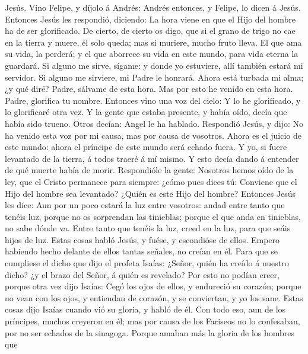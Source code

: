 Jesús.  Vino Felipe, y díjolo á Andrés: Andrés entonces, y
Felipe, lo dicen á Jesús.  Entonces Jesús les respondió,
diciendo: La hora viene en que el Hijo del hombre ha de ser glorificado.
 De cierto, de cierto os digo, que si el grano de trigo no
cae en la tierra y muere, él solo queda; mas si muriere, mucho fruto
lleva.  El que ama su vida, la perderá; y el que aborrece
su vida en este mundo, para vida eterna la guardará.  Si
alguno me sirve, sígame: y donde yo estuviere, allí también estará mi
servidor. Si alguno me sirviere, mi Padre le honrará. 
Ahora está turbada mi alma; ¿y qué diré? Padre, sálvame de esta hora.
Mas por esto he venido en esta hora.  Padre, glorifica tu
nombre. Entonces vino una voz del cielo: Y lo he glorificado, y lo
glorificaré otra vez.  Y la gente que estaba presente, y
había oído, decía que había sido trueno. Otros decían: Angel le ha
hablado.  Respondió Jesús, y dijo: No ha venido esta voz
por mi causa, mas por causa de vosotros.  Ahora es el
juicio de este mundo: ahora el príncipe de este mundo será echado fuera.
 Y yo, si fuere levantado de la tierra, á todos traeré á mí
mismo.  Y esto decía dando á entender de qué muerte había
de morir.  Respondióle la gente: Nosotros hemos oído de la
ley, que el Cristo permanece para siempre: ¿cómo pues dices tú: Conviene
que el Hijo del hombre sea levantado? ¿Quién es este Hijo del hombre?
 Entonces Jesús les dice: Aun por un poco estará la luz
entre vosotros: andad entre tanto que tenéis luz, porque no os
sorprendan las tinieblas; porque el que anda en tinieblas, no sabe dónde
va.  Entre tanto que tenéis la luz, creed en la luz, para
que seáis hijos de luz. Estas cosas habló Jesús, y fuése, y escondióse
de ellos.  Empero habiendo hecho delante de ellos tantas
señales, no creían en él.  Para que se cumpliese el dicho
que dijo el profeta Isaías: ¿Señor, quién ha creído á nuestro dicho? ¿y
el brazo del Señor, á quién es revelado?  Por esto no
podían creer, porque otra vez dijo Isaías:  Cegó los ojos
de ellos, y endureció su corazón; porque no vean con los ojos, y
entiendan de corazón, y se conviertan, y yo los sane. 
Estas cosas dijo Isaías cuando vió su gloria, y habló de él.
 Con todo eso, aun de los príncipes, muchos creyeron en él;
mas por causa de los Fariseos no lo confesaban, por no ser echados de la
sinagoga.  Porque amaban más la gloria de los hombres que
